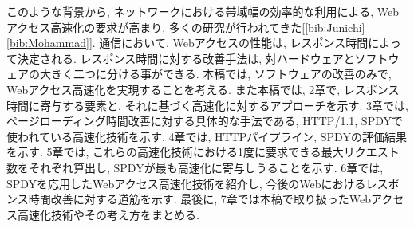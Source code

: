 \documentclass[twocolumn]{jsarticle}
\begin{document}
このような背景から, ネットワークにおける帯域幅の効率的な利用による, Webアクセス高速化の要求が高まり,
多くの研究が行われてきた[\ref{bib:Junichi}-\ref{bib:Mohammad}].
通信において, Webアクセスの性能は, レスポンス時間によって決定される.
レスポンス時間に対する改善手法は, 対ハードウェアとソフトウェアの大きく二つに分ける事ができる.
本稿では, ソフトウェアの改善のみで, Webアクセス高速化を実現することを考える.
また本稿では, 2章で, レスポンス時間に寄与する要素と, それに基づく高速化に対するアプローチを示す.
3章では, ページローディング時間改善に対する具体的な手法である, HTTP/1.1, SPDYで使われている高速化技術を示す.
4章では, HTTPパイプライン, SPDYの評価結果を示す.
5章では, これらの高速化技術における1度に要求できる最大リクエスト数をそれぞれ算出し, SPDYが最も高速化に寄与しうることを示す.
6章では, SPDYを応用したWebアクセス高速化技術を紹介し, 今後のWebにおけるレスポンス時間改善に対する道筋を示す.
最後に, 7章では本稿で取り扱ったWebアクセス高速化技術やその考え方をまとめる.
\end{document}

